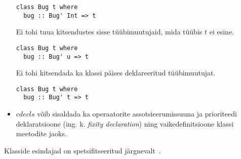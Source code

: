 \documentclass[12pt]{article}
\begin{document}
\begin{itemize}
            \begin{verbatim}class Bug t where
  bug :: Bug' Int => t\end{verbatim}

            Ei tohi tuua kitsendustes sisse tüübimuutujaid, mida tüübis $t$ ei esine.

            \begin{verbatim}class Bug t where
  bug :: Bug' u => t\end{verbatim}

            Ei tohi kitsendada ka klassi päises deklareeritud tüübimuutujat.

            \begin{verbatim}class Bug t where
  bug :: Bug' t => t\end{verbatim}
          \item
            $cdecls$ võib sisaldada ka operaatorite assotsieerumissuuna ja prioriteedi deklaratsioone (ing. k. \textit{fixity declaration}) ning vaikedefinitsioone klassi meetodite jaoks.
        \end{itemize}

        Klasside esindajad on spetsifitseeritud järgnevalt~\cite{Has}.
\end{document}
